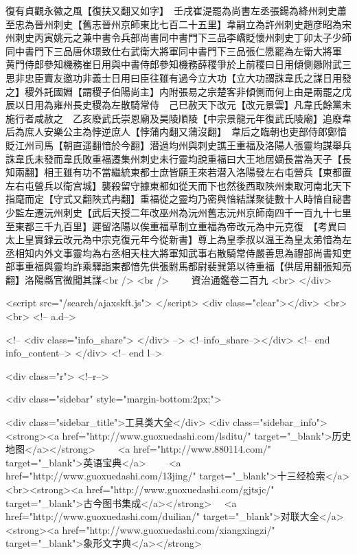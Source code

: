 復有貞觀永徽之風【復扶又翻又如字】　壬戌崔湜罷為尚書左丞張鍚為絳州刺史蕭至忠為晉州刺史【舊志晉州京師東比七百二十五里】韋嗣立為許州刺史趙彦昭為宋州刺史丙寅姚元之兼中書令兵部尚書同中書門下三品李嶠貶懷州刺史丁卯太子少師同中書門下三品唐休璟致仕右武衛大將軍同中書門下三品張仁愿罷為左衛大將軍　黄門侍郎參知機務崔日用與中書侍郎參知機務薛稷爭於上前稷曰日用傾側曏附武三思非忠臣賣友邀功非義士日用曰臣往雖有過今立大功【立大功謂誅韋氏之謀日用發之】稷外託國婣【謂稷子伯陽尚主】内附張易之宗楚客非傾側而何上由是兩罷之戊辰以日用為雍州長史稷為左散騎常侍　己巳赦天下改元【改元景雲】凡韋氏餘黨未施行者咸赦之　乙亥廢武氏崇恩廟及昊陵順陵【中宗景龍元年復武氏陵廟】追廢韋后為庶人安樂公主為悖逆庶人【悖蒲内翻又蒲沒翻】　韋后之臨朝也吏部侍郎鄭愔貶江州司馬【朝直遥翻愔於今翻】潜過均州與刺史譙王重福及洛陽人張靈均謀舉兵誅韋氏未發而韋氏敗重福遷集州刺史未行靈均說重福曰大王地居嫡長當為天子【長知兩翻】相王雖有功不當繼統東都士庶皆願王來若潜入洛陽發左右屯營兵【東都置左右屯營兵以衛宫城】襲殺留守據東都如從天而下也然後西取陜州東取河南北天下指麾而定【守式又翻陜式冉翻】重福從之靈均乃密與愔結謀聚徒數十人時愔自祕書少監左遷沅州刺史【武后天授二年改巫州為沅州舊志沅州京師南四千一百九十七里至東都三千九百里】遲留洛陽以俟重福草制立重福為帝改元為中元克復　【考異曰太上皇實録云改元為中宗克復元年今從新書】尊上為皇季叔以温王為皇太弟愔為左丞相知内外文事靈均為右丞相天柱大將軍知武事右散騎常侍嚴善思為禮部尚書知吏部事重福與靈均詐乘驛詣東都愔先供張駙馬都尉裴巽第以待重福【供居用翻張知亮翻】洛陽縣官微聞其謀<br />
<br />
　　資治通鑑卷二百九  <br>
   </div> 

<script src="/search/ajaxskft.js"> </script>
 <div class="clear"></div>
<br>
<br>
 <!-- a.d-->

 <!--
<div class="info_share">
</div> 
-->
 <!--info_share--></div>   <!-- end info_content-->
  </div> <!-- end l-->

<div class="r">   <!--r-->



<div class="sidebar"  style="margin-bottom:2px;">

 
<div class="sidebar_title">工具类大全</div>
<div class="sidebar_info">
<strong><a href="http://www.guoxuedashi.com/lsditu/" target="_blank">历史地图</a></strong>　　
<a href="http://www.880114.com/" target="_blank">英语宝典</a>　　
<a href="http://www.guoxuedashi.com/13jing/" target="_blank">十三经检索</a>　
<br><strong><a href="http://www.guoxuedashi.com/gjtsjc/" target="_blank">古今图书集成</a></strong>　
<a href="http://www.guoxuedashi.com/duilian/" target="_blank">对联大全</a>　<strong><a href="http://www.guoxuedashi.com/xiangxingzi/" target="_blank">象形文字典</a></strong>　

